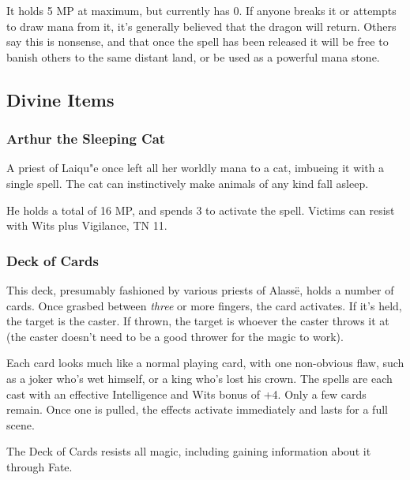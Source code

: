 \begin{multicols}{2}
It holds 5 MP at maximum, but currently has 0.  If anyone breaks it or attempts to draw mana from it, it's generally believed that the dragon will return.  Others say this is nonsense, and that once the spell has been released it will be free to banish others to the same distant land, or be used as a powerful mana stone.

\subsection{Divine Items}

\subsubsection{Arthur the Sleeping Cat}
A priest of Laiqu"{e} once left all her worldly mana to a cat, imbueing it with a single spell.  The cat can instinctively make animals of any kind fall asleep.

He holds a total of 16 MP, and spends 3 to activate the spell.  Victims can resist with Wits plus Vigilance, TN 11.

\subsubsection{Deck of Cards}\label{deckofmanythings}

This deck, presumably fashioned by various priests of Alass\"{e}, holds a number of cards.  Once grasbed between \emph{three} or more fingers, the card activates.  If it's held, the target is the caster.  If thrown, the target is whoever the caster throws it at (the caster doesn't need to be a good thrower for the magic to work).

Each card looks much like a normal playing card, with one non-obvious flaw, such as a joker who's wet himself, or a king who's lost his crown.  The spells are each cast with an effective Intelligence and Wits bonus of +4.  Only a few cards remain.  Once one is pulled, the effects activate immediately and lasts for a full scene.

The Deck of Cards resists all magic, including gaining information about it through Fate.

\vfill\null


\end{multicols}
